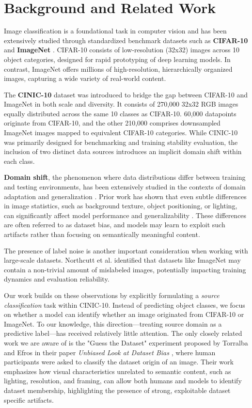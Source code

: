 \section{Background and Related Work}

Image classification is a foundational task in computer vision and has been extensively studied through standardized benchmark datasets such as \textbf{CIFAR-10} 
\cite{krizhevsky2009learning} and \textbf{ImageNet} \cite{deng2009imagenet}. CIFAR-10 consists of low-resolution (32x32) images across 10 object categories, 
designed for rapid prototyping of deep learning models. In contrast, ImageNet offers millions of high-resolution, hierarchically organized images, capturing a wide variety of real-world content.

The \textbf{CINIC-10} dataset \cite{darlow2018cinic} was introduced to bridge the gap between CIFAR-10 and ImageNet in both scale and diversity. It consists of 
270,000 32x32 RGB images equally distributed across the same 10 classes as CIFAR-10. 60,000 datapoints originate from CIFAR-10, and the other 210,000 comprises downsampled ImageNet 
images mapped to equivalent CIFAR-10 categories. While CINIC-10 was primarily designed for benchmarking and training stability evaluation, the inclusion of two distinct data sources 
introduces an implicit domain shift within each class.

\textbf{Domain shift}, the phenomenon where data distributions differ between training and testing environments, has been extensively studied in the contexts of domain adaptation and 
generalization \cite{wang2018deep}. Prior work has shown that even subtle differences in image statistics, such as background texture, object positioning, or lighting, can significantly 
affect model performance and generalizability \cite{torralba2011unbiased, recht2019imagenet}. These differences are often referred to as dataset bias, and models may learn to exploit such 
artifacts rather than focusing on semantically meaningful content.

The presence of label noise is another important consideration when working with large-scale datasets. Northcutt et al. \cite{northcutt2021confident} identified that datasets like ImageNet 
may contain a non-trivial amount of mislabeled images, potentially impacting training dynamics and evaluation reliability.

Our work builds on these observations by explicitly formulating a \textit{source classification} task within CINIC-10. Instead of predicting object classes, we focus on whether a model
can identify whether an image originated from CIFAR-10 or ImageNet. To our knowledge, this direction—treating source domain as a predictive label—has received relatively little attention. 
The only closely related work we are aware of is the "Guess the Dataset" experiment proposed by Torralba and Efros in their paper \textit{Unbiased Look at Dataset Bias} 
\cite{torralba2011unbiased}, where human participants were asked to classify the dataset origin of an image. 
Their work emphasizes how visual characteristics unrelated to semantic content, such as lighting, resolution, and framing, can allow both humans and models to identify dataset membership, 
highlighting the presence of strong, exploitable dataset specific artifacts.
